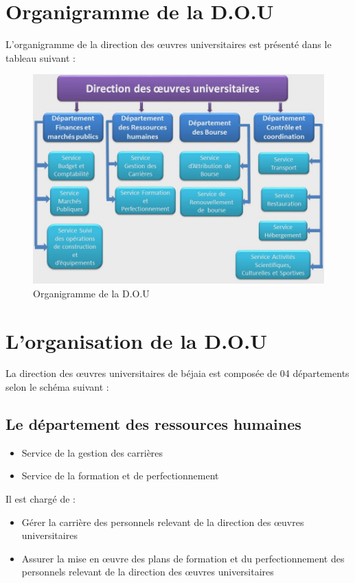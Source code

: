 \section{Organigramme de la D.O.U}
    L’organigramme de la direction des œuvres universitaires est présenté dans le tableau suivant :
    \begin{figure}[H]
        \centering
            \includegraphics[scale=0.4]{chapitre1/direction-diag.jpg}
        \caption{Organigramme de la D.O.U}
    \end{figure} 

\section{L’organisation de la D.O.U}
    La direction des œuvres universitaires de béjaia est composée de 04 départements selon le schéma suivant :

\subsection{Le département des ressources humaines}
    \begin{itemize}
        \item Service de la gestion des carrières
        \item Service de la formation et de perfectionnement\\
    \end{itemize}

    Il est chargé de :
    \begin{itemize}
        \item Gérer la carrière des personnels relevant de la direction des œuvres universitaires
        \item Assurer la mise en œuvre des plans de formation et du perfectionnement des personnels relevant de la direction des œuvres universitaires
    \end{itemize}


